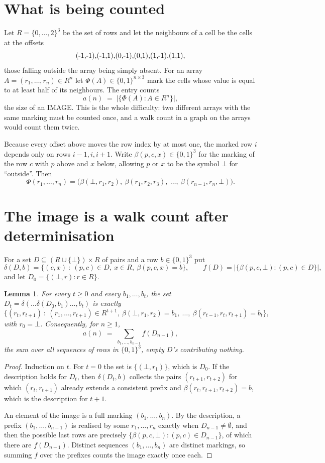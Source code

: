 \documentclass[11pt,a4paper]{article}
\theoremstyle{plain}
\newtheorem{lemma}[theorem]{Lemma}
\theoremstyle{definition}
\begin{document}
\section{What is being counted}

Let $R=\{0,\dots,2\}^{3}$ be the set of rows and let the neighbours of a cell be the
cells at the offsets
\[
$(-1,-1)$, $(-1,1)$, $(0,-1)$, $(0,1)$, $(1,-1)$, $(1,1)$,
\]
those falling outside the array being simply absent. For an array
$A=(r_1,\dots,r_n)\in R^n$ let $\Phi(A)\in\{0,1\}^{n\times3}$ mark the cells whose value
is equal to at least half of its neighbours. The entry counts
\[
a(n)\;=\;\bigl|\{\Phi(A):A\in R^n\}\bigr| ,
\]
the size of an IMAGE. This is the whole difficulty: two different arrays with the same marking
must be counted once, and a walk count in a graph on the arrays would count them twice.

Because every offset above moves the row index by at most one, the marked row $i$ depends only
on rows $i-1,i,i+1$. Write $\beta(p,c,x)\in\{0,1\}^{3}$ for the marking of the row $c$
with $p$ above and $x$ below, allowing $p$ or $x$ to be the symbol $\bot$ for ``outside''.
Then
\[
\Phi(r_1,\dots,r_n)=\bigl(\beta(\bot,r_1,r_2),\ \beta(r_1,r_2,r_3),\ \dots,\
\beta(r_{n-1},r_n,\bot)\bigr).
\]

\section{The image is a walk count after determinisation}

For a set $D\subseteq(R\cup\{\bot\})\times R$ of pairs and a row $b\in\{0,1\}^{3}$ put
\[
\delta(D,b)=\{(c,x)\ :\ (p,c)\in D,\ x\in R,\ \beta(p,c,x)=b\},\qquad
f(D)=\bigl|\{\beta(p,c,\bot):(p,c)\in D\}\bigr| ,
\]
and let $D_0=\{(\bot,r):r\in R\}$.

\begin{lemma}\label{lem:det}
For every $t\ge0$ and every $b_1,\dots,b_t$, the set
$D_t=\delta(\dots\delta(D_0,b_1)\dots,b_t)$ is exactly
\[
\{(r_t,r_{t+1})\ :\ (r_1,\dots,r_{t+1})\in R^{t+1},\ \beta(\bot,r_1,r_2)=b_1,\ \dots,\
\beta(r_{t-1},r_t,r_{t+1})=b_t\} ,
\]
with $r_0=\bot$. Consequently, for $n\ge1$,
\[
a(n)\;=\;\sum_{b_1,\dots,b_{n-1}}f(D_{n-1}),
\]
the sum over all sequences of rows in $\{0,1\}^{3}$, empty $D$'s contributing nothing.
\end{lemma}

\begin{proof}
Induction on $t$. For $t=0$ the set is $\{(\bot,r_1)\}$, which is $D_0$. If the description
holds for $D_t$, then $\delta(D_t,b)$ collects the pairs $(r_{t+1},r_{t+2})$ for which
$(r_t,r_{t+1})$ already extends a consistent prefix and
$\beta(r_t,r_{t+1},r_{t+2})=b$, which is the description for $t+1$.

An element of the image is a full marking $(b_1,\dots,b_n)$. By the description, a prefix
$(b_1,\dots,b_{n-1})$ is realised by some $r_1,\dots,r_n$ exactly when $D_{n-1}\neq
\emptyset$, and then the possible last rows are precisely
$\{\beta(p,c,\bot):(p,c)\in D_{n-1}\}$, of which there are $f(D_{n-1})$. Distinct
sequences $(b_1,\dots,b_n)$ are distinct markings, so summing $f$ over the prefixes counts the
image exactly once each.
\end{proof}
\end{document}
